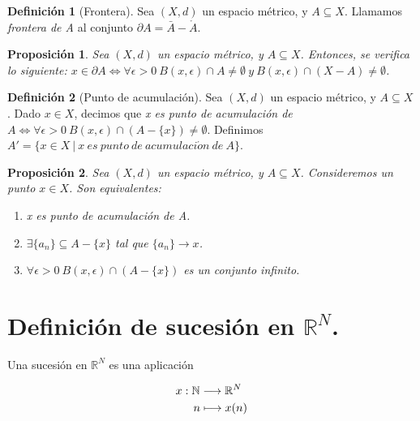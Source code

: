 \documentclass[11pt,a4paper, titlepage]{article}
\theoremstyle{plain}
\newtheorem*{nprop}{Proposición}
\theoremstyle{remark}
\theoremstyle{definition}
\newtheorem*{ndef}{Definición}
\newenvironment{nlist}
  {\begin{enumerate}\renewcommand\labelenumi{(\emph{\roman{enumi})}}}
  {\end{enumerate}}
\begin{document}
\begin{ndef}[Frontera]
Sea $(X,d)$ un espacio métrico, y $A\subseteq X$. Llamamos \textit{frontera de A} al conjunto $\partial A = \bar{A}-\mathring{A}$.	
\end{ndef}



\begin{nprop}
Sea $(X,d)$ un espacio métrico, y $A\subseteq X$. Entonces, se verifica lo siguiente:
$x\in \partial A \iff \forall \epsilon > 0\ B(x,\epsilon)\cap A \neq \emptyset \ y\ B(x,\epsilon)\cap (X-A) \neq \emptyset$.
\end{nprop}



\begin{ndef}[Punto de acumulación]
Sea $(X,d)$ un espacio métrico, y $A\subseteq X$. Dado $x\in X$, decimos que \textit{x es punto de acumulación de} $A \iff \forall \epsilon > 0\ B(x,\epsilon)\cap (A-\{x\})\neq \emptyset$. Definimos $A' = \{ x\in X \ | \ x\ es\ punto\ de\ acumulaci\acute{o}n\ de\ A \}$.
\end{ndef}



\begin{nprop}
Sea $(X,d)$ un espacio métrico, y $A\subseteq X$. Consideremos un punto $x\in X$. Son equivalentes:

\begin{nlist}
\item x es punto de acumulación de A.
\item $\exists \{a_n\}\subseteq A-\{x\}$ tal que $\{a_n\} \rightarrow x$.
\item $\forall \epsilon > 0\ B(x,\epsilon)\cap (A-\{x\})$ es un conjunto infinito. 
\end{nlist}
\end{nprop}



\newpage



\section*{Definición de sucesión en $\mathbb{R}^N$.}

Una sucesión en $\mathbb{R}^N$ es una aplicación 

\begin{align}
&x : \mathbb{N} \longrightarrow { \mathbb{R}^N }\notag \\
&\quad\;\; n \longmapsto { x(n) }\notag
\end{align}
\end{document}
